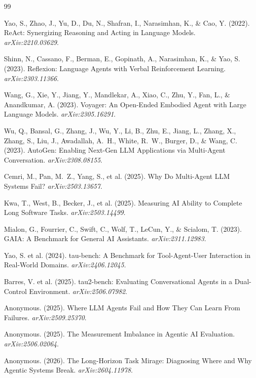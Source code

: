 \documentclass[11pt]{article}
\begin{document}

\begin{thebibliography}{99}

 Yao, S., Zhao, J., Yu, D., Du, N., Shafran, I., Narasimhan, K., \& Cao, Y. (2022). ReAct: Synergizing Reasoning and Acting in Language Models. \emph{arXiv:2210.03629}.

 Shinn, N., Cassano, F., Berman, E., Gopinath, A., Narasimhan, K., \& Yao, S. (2023). Reflexion: Language Agents with Verbal Reinforcement Learning. \emph{arXiv:2303.11366}.

 Wang, G., Xie, Y., Jiang, Y., Mandlekar, A., Xiao, C., Zhu, Y., Fan, L., \& Anandkumar, A. (2023). Voyager: An Open-Ended Embodied Agent with Large Language Models. \emph{arXiv:2305.16291}.

 Wu, Q., Bansal, G., Zhang, J., Wu, Y., Li, B., Zhu, E., Jiang, L., Zhang, X., Zhang, S., Liu, J., Awadallah, A.~H., White, R.~W., Burger, D., \& Wang, C. (2023). AutoGen: Enabling Next-Gen LLM Applications via Multi-Agent Conversation. \emph{arXiv:2308.08155}.

 Cemri, M., Pan, M.~Z., Yang, S., et al. (2025). Why Do Multi-Agent LLM Systems Fail? \emph{arXiv:2503.13657}.

 Kwa, T., West, B., Becker, J., et al. (2025). Measuring AI Ability to Complete Long Software Tasks. \emph{arXiv:2503.14499}.

 Mialon, G., Fourrier, C., Swift, C., Wolf, T., LeCun, Y., \& Scialom, T. (2023). GAIA: A Benchmark for General AI Assistants. \emph{arXiv:2311.12983}.

 Yao, S. et al. (2024). tau-bench: A Benchmark for Tool-Agent-User Interaction in Real-World Domains. \emph{arXiv:2406.12045}.

 Barres, V. et al. (2025). tau2-bench: Evaluating Conversational Agents in a Dual-Control Environment. \emph{arXiv:2506.07982}.

 Anonymous. (2025). Where LLM Agents Fail and How They Can Learn From Failures. \emph{arXiv:2509.25370}.

 Anonymous. (2025). The Measurement Imbalance in Agentic AI Evaluation. \emph{arXiv:2506.02064}.

 Anonymous. (2026). The Long-Horizon Task Mirage: Diagnosing Where and Why Agentic Systems Break. \emph{arXiv:2604.11978}.

\end{thebibliography}
\end{document}

